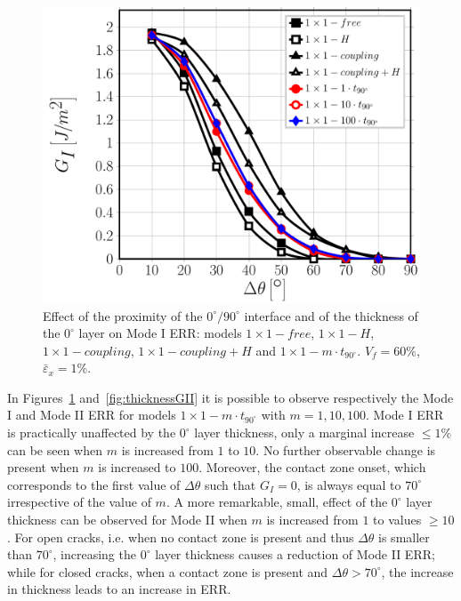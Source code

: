 \documentclass[Review,sagev,times]{sagej}
\begin{document}
\begin{figure}[!htb]
\centering
\includegraphics[height=0.375\textheight]{1x1-i-vf60-GI.pdf}
\caption{Effect of the proximity of the $0^{\circ}/90^{\circ}$ interface and of the thickness of the $0^{\circ}$ layer on Mode I ERR: models $1\times 1-free$, $1\times 1-H$, $1\times 1-coupling$, $1\times 1-coupling+H$ and $1\times 1-m\cdot t_{90^{\circ}}$. $V_{f}=60\%$, $\bar{\varepsilon}_{x}=1\%$.}\label{fig:thicknessGI}
\end{figure}

In Figures~\ref{fig:thicknessGI} and~\ref{fig:thicknessGII} it is possible to observe respectively the Mode I and Mode II ERR for models $1\times 1-m\cdot t_{90^{\circ}}$ with $m=1,10,100$. Mode I ERR is practically unaffected by the $0^{\circ}$ layer thickness, only a marginal increase $\leq1\%$ can be seen when $m$ is increased from $1$ to $10$. No further observable change is present when $m$ is increased to $100$. Moreover, the contact zone onset, which corresponds to the first value of $\Delta\theta$ such that $G_{I}=0$, is always equal to $70^{\circ}$ irrespective of the value of $m$. A more remarkable,  small, effect of the $0^{\circ}$ layer thickness can be observed for Mode II when $m$ is increased from $1$ to values $\geq10$. For open cracks, i.e. when no contact zone is present and thus $\Delta\theta$ is smaller than $70^{\circ}$, increasing the $0^{\circ}$ layer thickness causes a reduction of Mode II ERR; while for closed cracks, when a contact zone is present and $\Delta\theta>70^{\circ}$, the increase in thickness leads to an increase in ERR.\\
\end{document}
